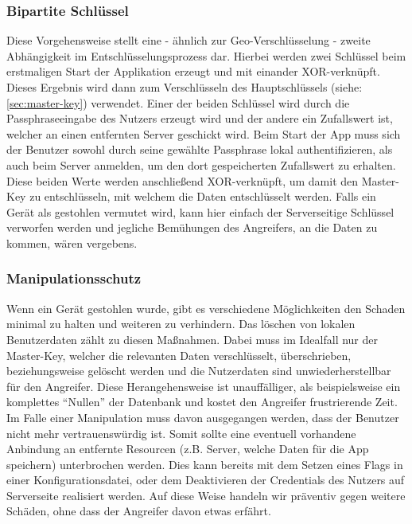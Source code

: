 		\subsubsection{Bipartite Schlüssel}
			Diese Vorgehensweise stellt eine - ähnlich zur Geo-Verschlüsselung - zweite
			Abhängigkeit im Entschlüsselungsprozess dar. Hierbei werden zwei Schlüssel
			beim erstmaligen Start der Applikation erzeugt und mit einander
			XOR-verknüpft. Dieses Ergebnis wird dann zum Verschlüsseln des
			Hauptschlüssels (siehe: \ref{sec:master-key}) verwendet. Einer der beiden
			Schlüssel wird durch die Passphraseeingabe des Nutzers erzeugt wird und der
			andere ein Zufallswert ist, welcher an einen entfernten Server geschickt
			wird. Beim Start der App muss sich der Benutzer sowohl durch seine
			gewählte Passphrase lokal authentifizieren, als auch beim Server anmelden, um
			den dort gespeicherten Zufallswert zu erhalten. Diese beiden Werte werden
			anschließend XOR-verknüpft, um damit den Master-Key zu entschlüsseln, mit
			welchem die Daten entschlüsselt werden. Falls ein Gerät als
			gestohlen vermutet wird, kann hier einfach der Serverseitige Schlüssel verworfen
			werden und jegliche Bemühungen des Angreifers, an die Daten zu kommen, wären
			vergebens.
		\subsubsection{Manipulationsschutz}
			Wenn ein Gerät gestohlen wurde, gibt es verschiedene Möglichkeiten den
			Schaden minimal zu halten und weiteren zu verhindern. Das löschen von lokalen
			Benutzerdaten zählt zu diesen Maßnahmen. Dabei muss im Idealfall nur der
			Master-Key, welcher die relevanten Daten verschlüsselt,	überschrieben,
			beziehungsweise gelöscht werden und die Nutzerdaten sind unwiederherstellbar
			für den Angreifer. Diese Herangehensweise ist unauffälliger, als
			beispielsweise ein komplettes "`Nullen"' der Datenbank und kostet den
			Angreifer frustrierende Zeit.\\
			Im Falle einer Manipulation muss davon ausgegangen werden, dass der Benutzer
			nicht mehr vertrauenswürdig ist. Somit sollte eine eventuell vorhandene
			Anbindung an entfernte Resourcen (z.B. Server, welche Daten für die App
			speichern) unterbrochen werden. Dies kann bereits mit dem Setzen eines Flags
			in einer Konfigurationsdatei, oder dem Deaktivieren der Credentials des
			Nutzers auf Serverseite realisiert werden. Auf diese Weise handeln wir
			präventiv gegen weitere Schäden, ohne dass der Angreifer davon etwas
			erfährt.\\
